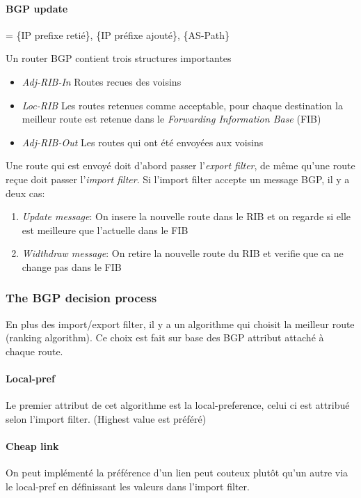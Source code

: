 \paragraph{BGP update} = \{IP prefixe retié\}, \{IP préfixe ajouté\}, \{AS-Path\}

Un router BGP contient trois structures importantes
\begin{itemize}
\item \textit{Adj-RIB-In} Routes recues des voisins
\item \textit{Loc-RIB} Les routes retenues comme acceptable, pour chaque destination la meilleur route est retenue dans le \textit{Forwarding Information Base} (FIB)
\item \textit{Adj-RIB-Out} Les routes qui ont été envoyées aux voisins
\end{itemize}
Une route qui est envoyé doit d'abord passer l'\textit{export filter}, de même qu'une route reçue doit passer l'\textit{import filter}. Si l'import filter accepte un message BGP, il y a deux cas:
\begin{enumerate}
\item \textit{Update message}: On insere la nouvelle route dans le RIB et on regarde si elle est meilleure que l'actuelle dans le FIB
\item \textit{Widthdraw message}: On retire la nouvelle route du RIB et verifie que ca ne change pas dans le FIB
\end{enumerate}

\subsubsection{The BGP decision process}
En plus des import/export filter, il y a un algorithme qui choisit la meilleur route (ranking algorithm). Ce choix est fait sur base des BGP attribut attaché à chaque route.

\paragraph{Local-pref}
Le premier attribut de cet algorithme est la local-preference, celui ci est attribué
selon l'import filter. (Highest value est préféré)

\paragraph{Cheap link} On peut implémenté la préférence d'un lien peut couteux
plutôt qu'un autre via le local-pref en définissant les valeurs dans l'import filter.



